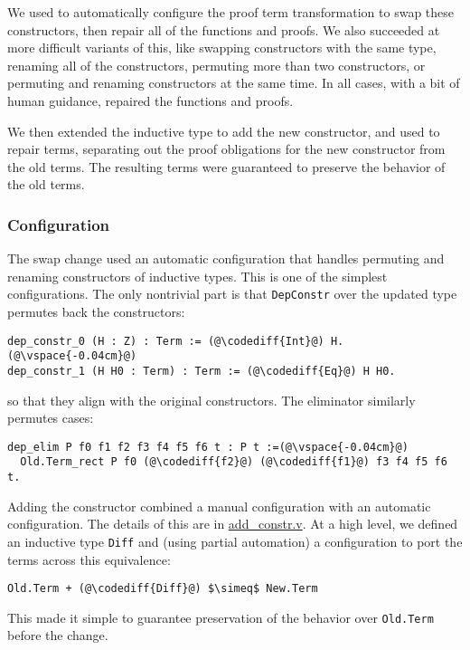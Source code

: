 We used \toolname to automatically configure the proof term transformation to swap these constructors,
then repair all of the functions and proofs.
We also succeeded at more difficult variants of this,
like swapping constructors with the same type, renaming all of the constructors,
permuting more than two constructors,
or permuting and renaming constructors at the same time.
In all cases, with a bit of human guidance, \toolname repaired the functions and proofs.

We then extended the inductive type to add the new constructor, and used \toolname to repair terms,
separating out the proof obligations for the new constructor from the old terms.
The resulting terms were guaranteed to preserve the behavior of the old terms.

\subsubsection{Configuration}

The swap change used an automatic configuration that handles permuting and renaming constructors of inductive types.
This is one of the simplest configurations.
The only nontrivial part is that \lstinline{DepConstr} over the updated type permutes back the constructors:

\begin{lstlisting}[backgroundcolor=\color{cyan!30}]
dep_constr_0 (H : Z) : Term := (@\codediff{Int}@) H.(@\vspace{-0.04cm}@)
dep_constr_1 (H H0 : Term) : Term := (@\codediff{Eq}@) H H0.
\end{lstlisting}
so that they align with the original constructors.
The eliminator similarly permutes cases:

\begin{lstlisting}[backgroundcolor=\color{cyan!30}]
dep_elim P f0 f1 f2 f3 f4 f5 f6 t : P t :=(@\vspace{-0.04cm}@)
  Old.Term_rect P f0 (@\codediff{f2}@) (@\codediff{f1}@) f3 f4 f5 f6 t.
\end{lstlisting}

Adding the constructor combined a manual configuration with an automatic configuration.
The details of this are in \href{https://github.com/uwplse/pumpkin-pi/blob/master/plugin/coq/playground/add_constr.v}{add_constr.v}.
At a high level, we defined an inductive type \lstinline{Diff} and (using partial automation) a configuration to port the terms across this equivalence:

\begin{lstlisting}
Old.Term + (@\codediff{Diff}@) $\simeq$ New.Term
\end{lstlisting}
This made it simple to guarantee preservation of the behavior over \lstinline{Old.Term} before the change.

